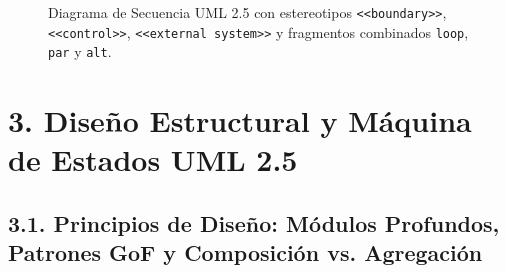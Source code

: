 \documentclass[12pt,letterpaper]{report}
\begin{document}
\begin{figure}[H]
{{}}
    \small
    \caption{Diagrama de Secuencia UML 2.5 con estereotipos \texttt{<<boundary>>}, \texttt{<<control>>}, \texttt{<<external system>>} y fragmentos combinados \texttt{loop}, \texttt{par} y \texttt{alt}.}
    \label{fig:secuencia}
\end{figure}

\newpage
\section*{3. Diseño Estructural y Máquina de Estados UML 2.5}

\subsection*{3.1. Principios de Diseño: Módulos Profundos, Patrones GoF y Composición vs. Agregación}
\end{document}
